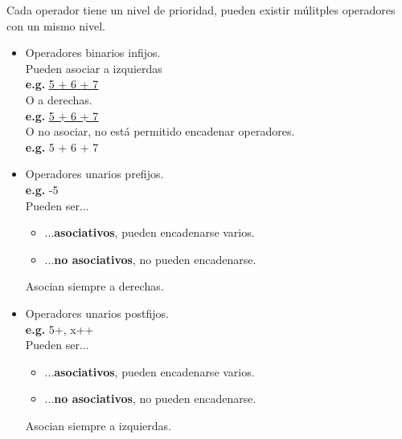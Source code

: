 \documentclass[\main/ApuntesPL.tex]{subfiles}
\begin{document}
      \par
      Cada operador tiene un nivel de prioridad, pueden existir múlitples operadores con un mismo
      nivel.
      \begin{itemize}
        \item Operadores binarios infijos.\\
          \hspace{3mm}Pueden asociar a izquierdas\\
          \hspace{5mm}\textbf{e.g.} \underline{\underline{5 + 6} + 7}\\
          \vspace{2mm}
          \hspace{3mm}O a derechas.\\
          \hspace{5mm}\textbf{e.g.} \underline{5 + \underline{6 + 7}}\\
          \vspace{2mm}
          \hspace{3mm}O no asociar, no está permitido encadenar operadores.\\
          \hspace{5mm}\textbf{e.g.} {\color{red}5 + 6 + 7}
        \item Operadores unarios prefijos.\\
          \hspace{3mm}\textbf{e.g.} -5\\
          \vspace{2mm}
          Pueden ser...
          \begin{itemize}
            \item ...\textbf{asociativos}, pueden encadenarse varios.
            \item ...\textbf{no asociativos}, no pueden encadenarse.
          \end{itemize}
          Asocian siempre a derechas.
        \item Operadores unarios postfijos.\\
          \hspace{3mm}\textbf{e.g.} 5+, x++\\
          \vspace{2mm}
            Pueden ser...
            \begin{itemize}
              \item ...\textbf{asociativos}, pueden encadenarse varios.
              \item ...\textbf{no asociativos}, no pueden encadenarse.
            \end{itemize}
            Asocian siempre a izquierdas.
      \end{itemize}
\end{document}
